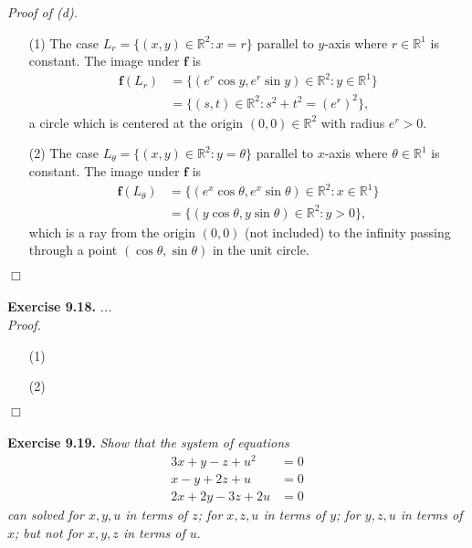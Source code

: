 \documentclass{article}
\begin{document}
\emph{Proof of (d).}
\begin{enumerate}
\item[(1)]
  The case $L_r = \{ (x,y) \in \mathbb{R}^2 : x = r \}$ parallel to $y$-axis
  where $r \in \mathbb{R}^1$ is constant.
  The image under $\mathbf{f}$ is
  \begin{align*}
    \mathbf{f}(L_r)
    &= \{ (e^r \cos y, e^r \sin y) \in \mathbb{R}^2 : y \in \mathbb{R}^1 \} \\
    &= \{ (s, t) \in \mathbb{R}^2 : s^2 + t^2 = (e^r)^2 \},
  \end{align*}
  a circle which is centered at the origin $(0,0) \in \mathbb{R}^2$ with radius $e^{r} > 0$.

\item[(2)]
  The case $L_{\theta} = \{ (x,y) \in \mathbb{R}^2 : y = \theta \}$ parallel to $x$-axis
  where $\theta \in \mathbb{R}^1$ is constant.
  The image under $\mathbf{f}$ is
  \begin{align*}
    \mathbf{f}(L_{\theta})
    &= \{ (e^x \cos \theta, e^x \sin \theta) \in \mathbb{R}^2 : x \in \mathbb{R}^1 \} \\
    &= \{ (y \cos \theta, y \sin \theta) \in \mathbb{R}^2 : y > 0 \},
  \end{align*}
  which is a ray from the origin $(0,0)$ (not included) to the infinity
  passing through a point $(\cos\theta, \sin\theta)$ in the unit circle.
\end{enumerate}
$\Box$ \\\\






\textbf{Exercise 9.18.}
\emph{...} \\

\emph{Proof.}
\begin{enumerate}
\item[(1)]
\item[(2)]

\end{enumerate}
$\Box$ \\\\






\textbf{Exercise 9.19.}
\emph{Show that the system of equations
\begin{align*}
  3x+y-z+u^2 &= 0 \\
  x-y+2z+u &= 0 \\
  2x+2y-3z+2u &= 0
\end{align*}
can solved
for $x,y,u$ in terms of $z$;
for $x,z,u$ in terms of $y$;
for $y,z,u$ in terms of $x$;
but not for $x,y,z$ in terms of $u.$} \\
\end{document}
